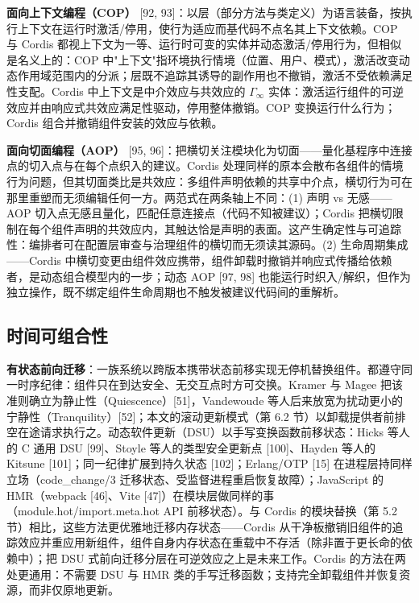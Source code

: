 \documentclass[11pt,a4paper]{article}
\theoremstyle{plain}
\theoremstyle{definition}
\theoremstyle{remark}
\begin{document}
\textbf{面向上下文编程（COP）} [92, 93]：以层（部分方法与类定义）为语言装备，按执行上下文在运行时激活/停用，使行为适应而基代码不点名其上下文依赖。COP 与 Cordis 都视上下文为一等、运行时可变的实体并动态激活/停用行为，但相似是名义上的：COP 中"上下文"指环境执行情境（位置、用户、模式），激活改变动态作用域范围内的分派；层既不追踪其诱导的副作用也不撤销，激活不受依赖满足性支配。Cordis 中上下文是中介效应与共效应的 $\Gamma_\infty$ 实体：激活运行组件的可逆效应并由响应式共效应满足性驱动，停用整体撤销。COP 变换运行什么行为；Cordis 组合并撤销组件安装的效应与依赖。

\textbf{面向切面编程（AOP）} [95, 96]：把横切关注模块化为切面——量化基程序中连接点的切入点与在每个点织入的建议。Cordis 处理同样的原本会散布各组件的情境行为问题，但其切面类比是共效应：多组件声明依赖的共享中介点，横切行为可在那里重塑而无须编辑任何一方。两范式在两条轴上不同：(1) 声明 vs 无感——AOP 切入点无感且量化，匹配任意连接点（代码不知被建议）；Cordis 把横切限制在每个组件声明的共效应内，其触达恰是声明的表面。这产生确定性与可追踪性：编排者可在配置层审查与治理组件的横切而无须读其源码。(2) 生命周期集成——Cordis 中横切变更由组件效应携带，组件卸载时撤销并响应式传播给依赖者，是动态组合模型内的一步；动态 AOP [97, 98] 也能运行时织入/解织，但作为独立操作，既不绑定组件生命周期也不触发被建议代码间的重解析。

\subsection{时间可组合性}

\textbf{有状态前向迁移}：一族系统以跨版本携带状态前移实现无停机替换组件。都遵守同一时序纪律：组件只在到达安全、无交互点时方可交换。Kramer 与 Magee 把该准则确立为静止性（Quiescence）[51]，Vandewoude 等人后来放宽为扰动更小的宁静性（Tranquility）[52]；本文的滚动更新模式（第 6.2 节）以卸载提供者前排空在途请求执行之。动态软件更新（DSU）以手写变换函数前移状态：Hicks 等人的 C 通用 DSU [99]、Stoyle 等人的类型安全更新点 [100]、Hayden 等人的 Kitsune [101]；同一纪律扩展到持久状态 [102]；Erlang/OTP [15] 在进程层持同样立场（code\_change/3 迁移状态、受监督进程重启恢复故障）；JavaScript 的 HMR（webpack [46]、Vite [47]）在模块层做同样的事（module.hot/import.meta.hot API 前移状态）。与 Cordis 的模块替换（第 5.2 节）相比，这些方法更优雅地迁移内存状态——Cordis 从干净板撤销旧组件的追踪效应并重应用新组件，组件自身内存状态在重载中不存活（除非置于更长命的依赖中）；把 DSU 式前向迁移分层在可逆效应之上是未来工作。Cordis 的方法在两处更通用：不需要 DSU 与 HMR 类的手写迁移函数；支持完全卸载组件并恢复资源，而非仅原地更新。
\end{document}
